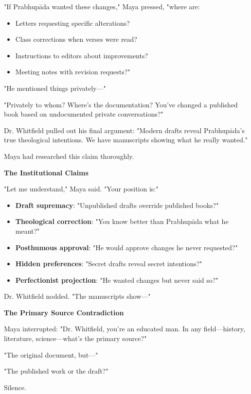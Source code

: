 \documentclass[12pt,twoside]{book}
\begin{document}
"If Prabhupāda wanted these changes," Maya pressed, "where are:
\begin{itemize}
\item Letters requesting specific alterations?
\item Class corrections when verses were read?
\item Instructions to editors about improvements?
\item Meeting notes with revision requests?"
\end{itemize}

"He mentioned things privately—"

"Privately to whom? Where's the documentation? You've changed a published book based on undocumented private conversations?"

Dr. Whitfield pulled out his final argument: "Modern drafts reveal Prabhupāda's true theological intentions. We have manuscripts showing what he really wanted."

Maya had researched this claim thoroughly.

\textbf{\textbf{The Institutional Claims}}

"Let me understand," Maya said. "Your position is:"

\begin{itemize}
\item \textbf{\textbf{Draft supremacy}}: "Unpublished drafts override published books?"
\item \textbf{\textbf{Theological correction}}: "You know better than Prabhupāda what he meant?"
\item \textbf{\textbf{Posthumous approval}}: "He would approve changes he never requested?"
\item \textbf{\textbf{Hidden preferences}}: "Secret drafts reveal secret intentions?"
\item \textbf{\textbf{Perfectionist projection}}: "He wanted changes but never said so?"
\end{itemize}

Dr. Whitfield nodded. "The manuscripts show—"

\textbf{\textbf{The Primary Source Contradiction}}

Maya interrupted: "Dr. Whitfield, you're an educated man. In any field—history, literature, science—what's the primary source?"

"The original document, but—"

"The published work or the draft?"

Silence.
\end{document}
